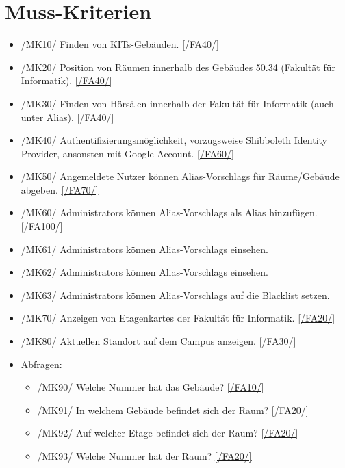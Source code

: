 \section{Muss-Kriterien}

\begin{itemize}

    \item{/MK10/} \label{/MK10/}Finden von \Glspl{KIT}-Gebäuden. \ref{/FA40/}
    \item{/MK20/} \label{/MK20/}Position von Räumen innerhalb des Gebäudes 50.34 (Fakultät für Informatik). \ref{/FA40/}
    \item{/MK30/} \label{/MK30/}Finden von Hörsälen innerhalb der Fakultät für Informatik (auch unter Alias). \ref{/FA40/}
    \item{/MK40/} \label{/MK40/}Authentifizierungsmöglichkeit, vorzugsweise Shibboleth Identity Provider, ansonsten mit Google-Account. \ref{/FA60/}
    \item{/MK50/} \label{/MK50/}Angemeldete Nutzer können \Glspl{Alias-Vorschlag} für Räume/Gebäude abgeben. \ref{/FA70/}
    \item{/MK60/} \label{/MK60/}\Glspl{Administrator} können \Glspl{Alias-Vorschlag} als \Gls{Alias} hinzufügen. \ref{/FA100/}
    \item{/MK61/} \label{/MK61/}\Glspl{Administrator} können \Glspl{Alias-Vorschlag} einsehen.
    \item{/MK62/} \label{/MK62/}\Glspl{Administrator} können \Glspl{Alias-Vorschlag} einsehen.
    \item{/MK63/} \label{/MK63/}\Glspl{Administrator} können \Glspl{Alias-Vorschlag} auf die \Gls{Blacklist} setzen.
    \item{/MK70/} \label{/MK70/}Anzeigen von \Glspl{Etagenkarte} der Fakultät für Informatik. \ref{/FA20/}
    \item{/MK80/} \label{/MK80/}Aktuellen Standort auf dem \Gls{Campus} anzeigen. \ref{/FA30/}
    \item Abfragen:
        \begin{itemize}
            \item{/MK90/} \label{/MK90/}Welche Nummer hat das Gebäude? \ref{/FA10/}
            \item{/MK91/} \label{/MK91/}In welchem Gebäude befindet sich der Raum? \ref{/FA20/}
            \item{/MK92/} \label{/MK92/}Auf welcher Etage befindet sich der Raum? \ref{/FA20/}
            \item{/MK93/} \label{/MK93/}Welche Nummer hat der Raum? \ref{/FA20/}

\end{itemize}
\end{itemize}
